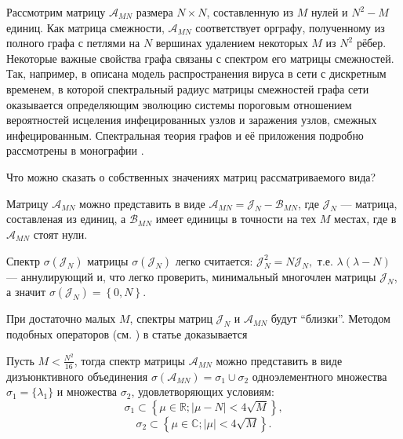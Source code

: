 Рассмотрим матрицу \( \mathscr{A}_{MN} \) размера \( N\times N \),
 составленную из \( M \) нулей и \( N^2 - M \) единиц.
Как матрица смежности, \( \mathscr{A}_{MN} \) соответствует орграфу,
 полученному из полного графа с петлями на \( N \) вершинах
 удалением некоторых \( M \) из \( N^2 \) рёбер.
Некоторые важные свойства графа связаны с спектром его матрицы смежностей.
Так, например, в \cite{epidemic} описана модель распространения вируса в сети
 с дискретным временем, в которой спектральный радиус матрицы смежностей графа сети
 оказывается определяющим эволюцию системы
 пороговым отношением вероятностей исцеления инфецированных узлов
 и заражения узлов, смежных инфецированным.
Спектральная теория графов и её приложения подробно рассмотрены
в монографии \cite{cvet}.

Что можно сказать о собственных значениях матриц рассматриваемого вида?

Матрицу \( \mathscr{A}_{MN} \) можно представить в виде
 \( \mathscr{A}_{MN} = \mathcal{J}_N - \mathscr{B}_{MN} \),
 где \( \mathcal{J}_N \) --- матрица, составленая из единиц,
 а \( \mathscr{B}_{MN} \) имеет единицы в точности на тех \( M \) местах,
 где в \( \mathscr{A}_{MN} \) стоят нули.

Спектр \( \sigma\left( \mathcal{J}_N \right) \)
 матрицы \( \sigma\left(\mathcal{J}_N\right) \) легко считается:
 \( \mathcal{J}_N^2 = N \mathcal{J}_N, \) т.е.
 \( \lambda(\lambda - N) \) --- аннулирующий и, что легко проверить,
 минимальный многочлен матрицы \( \mathcal{J}_N \), а значит
 \( \sigma\left( \mathcal{J}_N \right) = \left\{ 0,N \right\}. \)

При достаточно малых \( M \),
 спектры матриц \( \mathcal{J}_N \) и \( \mathscr{A}_{MN} \) будут ``близки''.
Методом подобных операторов (см. \cite{baskakov-harmonic}\cite{baskakov-split})
 в статье доказывается
\begin{thm}\label{thm:kozlukov-almost-all-ones}
    Пусть \( M < \frac{N^2}{16} \),
    тогда спектр матрицы \( \mathscr{A}_{MN} \) можно представить в виде дизъюнктивного
    объединения \( \sigma\left(\mathscr{A}_{MN}\right) = \sigma_1 \cup \sigma_2 \)
    одноэлементного множества \( \sigma_1=\{\lambda_1\} \)
    и множества \( \sigma_2 \), удовлетворяющих условиям:
    \[ \sigma_1 \subset \left\{ \mu\in\mathbb{R}; \lvert \mu - N \rvert < 4\sqrt{M} \right\}, \]
    \[ \sigma_2 \subset \left\{ \mu\in\mathbb{C}; \lvert \mu \rvert < 4\sqrt{M} \right\}. \]
\end{thm}
